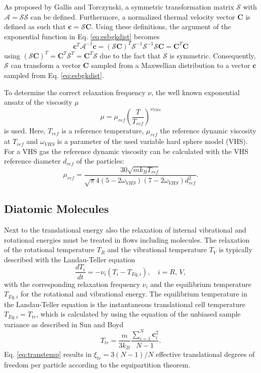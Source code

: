 \documentclass[aip,pof,amsmath,amssymb,preprint]{revtex4-1}
\begin{document}
As proposed by Gallis and Torczynski\cite{gallis2011investigation}, a symmetric transformation matrix $\mathcal S$ with $\mathcal A = \mathcal S \mathcal S$ can be defined. 
Furthermore, a normalized thermal velocity vector $\mathbf C$ is defined as such that $\mathbf c= \mathcal S \mathbf C$. 
Using these definitions, the argument of the exponential function in Eq. \eqref{eq:esbgkdist} becomes
\begin{equation}
\mathbf c^T \mathcal A^{-1} \mathbf c = (\mathcal S\mathbf C)^T \mathcal S^{-1} \mathcal S^{-1} \mathcal S\mathbf C = \mathbf C^T \mathbf C  
\label{eq:smat}
\end{equation}
using $(\mathcal S\mathbf C)^T=\mathbf C^T \mathcal S^T=\mathbf C^T \mathcal S$ due to the fact that $\mathcal S$ is symmetric. Consequently,
$\mathcal S$ can transform a vector $\mathbf C$ sampled from a Maxwellian distribution to a vector $\mathbf c$ sampled from Eq.
\eqref{eq:esbgkdist}.

To determine the correct relaxation frequency $\nu$, the well known exponential ansatz of the viscosity $\mu$
\begin{equation}
\mu=\mu_{ref}\left(\frac{T}{T_{ref}}\right)^{\omega_{VHS}}
\end{equation}
is used. Here, $T_{ref}$ is a reference temperature, $\mu_{ref}$ the reference dynamic viscosity at $T_{ref}$ \cite[]{burt2006evaluation}
and $\omega_{VHS}$ is a parameter of the used variable hard sphere model (VHS).  
For a VHS gas the reference dynamic viscosity can be calculated with the VHS reference diameter $d_{ref}$ of the particles:
\begin{equation}
\mu_{ref}=\frac{30\sqrt{mk_BT_{ref}}}{\sqrt{\pi}4(5-2\omega_{VHS})(7-2\omega_{VHS})d_{ref}^2}.
\end{equation}

\subsection{Diatomic Molecules}
Next to the translational energy also the relaxation of internal vibrational and rotational energies must be treated in flows including molecules.
The relaxation of the rotational temperature $T_R$ and the vibrational temperature $T_V$ is typically described with the Landau-Teller 
equation\cite{zhang:2013, Gimelshein2002, pfeiffer2016direct}
\begin{equation}
\frac{d T_i}{dt}=-\nu_i(T_i-T_{Eq,i}),\quad i=R,\,V,
\label{eq:landtel}
\end{equation}
with the corresponding relaxation frequency $\nu_i$ and the equilibrium temperature $T_{Eq,i}$ for the rotational and vibrational energy.
The equilibrium temperature in the Landau-Teller equation is the instantaneous translational cell temperature $T_{Eq,i}=T_{tr}$,
which is calculated by using the equation of the unbiased sample variance as described in Sun and Boyd\cite{sun2005evaluation} 
\begin{equation}
T_{tr}=\frac{m}{3 k_B}\frac{\sum_{i=1}^N \mathbf{c}^2_i}{N-1}.
\label{eq:transtemp}
\end{equation} 
Eq. \eqref{eq:transtemp} results in $\xi_{tr} = 3 (N-1)/N$ effective translational degrees of freedom per particle according to the equipartition theorem.
\end{document}
